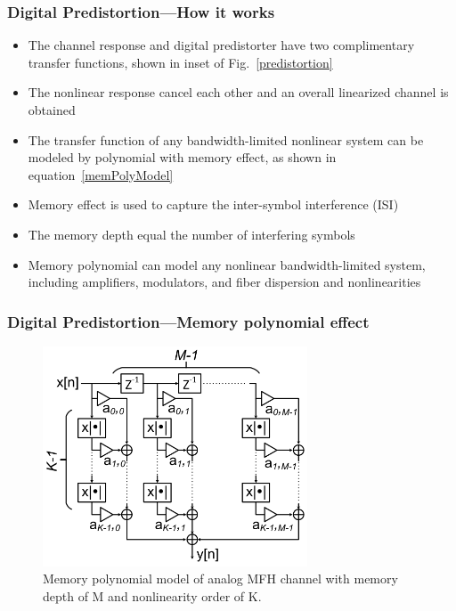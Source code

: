 \documentclass[t]{beamer}
\begin{document}
\begin{frame}
    \frametitle{Digital Predistortion---How it works}
    \begin{itemize}
        \item The channel response and digital predistorter have two complimentary transfer functions, shown in inset of Fig.~\ref{predistortion}
        \item The nonlinear response cancel each other and an overall linearized channel is obtained
        \item The transfer function of any bandwidth-limited nonlinear system can be modeled by polynomial with memory effect, as shown in equation~\ref{memPolyModel}
        \item Memory effect is used to capture the inter-symbol interference (ISI)
        \item The memory depth equal the number of interfering symbols 
        \item Memory polynomial can model any nonlinear bandwidth-limited system, including amplifiers, modulators, and fiber dispersion and nonlinearities
    \end{itemize}
    
    
\end{frame}

\begin{frame}
    \frametitle{Digital Predistortion---Memory polynomial effect}
    \begin{figure}\label{memorypolynomial}
        \includegraphics[width=0.7\textwidth]{memory-polynomial.PNG}
        \caption{Memory polynomial model of analog MFH channel with memory depth of M and nonlinearity order of K.}

    \end{figure}
\end{frame}
\end{document}
